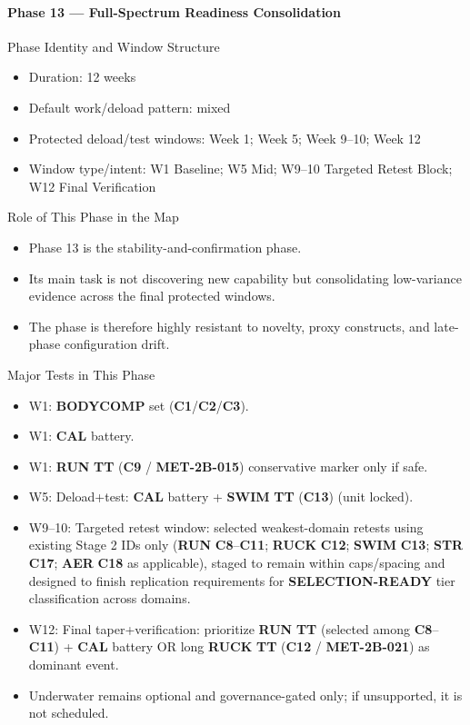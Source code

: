 \documentclass[10pt]{article}
\begin{document}
\newpage
\paragraph*{Phase 13 — Full-Spectrum Readiness Consolidation}

Phase Identity and Window Structure

\begin{itemize}
\item Duration: 12 weeks
\item Default work/deload pattern: mixed
\item Protected deload/test windows: Week 1; Week 5; Week 9–10; Week 12
\item Window type/intent: W1 Baseline; W5 Mid; W9–10 Targeted Retest Block; W12 Final Verification
\end{itemize}

Role of This Phase in the Map

\begin{itemize}
\item Phase 13 is the stability-and-confirmation phase.
\item Its main task is not discovering new capability but consolidating low-variance evidence across the final protected windows.
\item The phase is therefore highly resistant to novelty, proxy constructs, and late-phase configuration drift.
\end{itemize}

Major Tests in This Phase

\begin{itemize}
\item W1: \textbf{BODYCOMP} set (\textbf{C1}/\textbf{C2}/\textbf{C3}).
\item W1: \textbf{CAL} battery.
\item W1: \textbf{RUN} \textbf{TT} (\textbf{C9} / \textbf{MET-2B-015}) conservative marker only if safe.
\item W5: Deload+test: \textbf{CAL} battery + \textbf{SWIM} \textbf{TT} (\textbf{C13}) (unit locked).
\item W9–10: Targeted retest window: selected weakest-domain retests using existing Stage 2 IDs only (\textbf{RUN} \textbf{C8}–\textbf{C11}; \textbf{RUCK} \textbf{C12}; \textbf{SWIM} \textbf{C13}; \textbf{STR} \textbf{C17}; \textbf{AER} \textbf{C18} as applicable), staged to remain within caps/spacing and designed to finish replication requirements for \textbf{SELECTION-READY} tier classification across domains.
\item W12: Final taper+verification: prioritize \textbf{RUN} \textbf{TT} (selected among \textbf{C8}–\textbf{C11}) + \textbf{CAL} battery OR long \textbf{RUCK} \textbf{TT} (\textbf{C12} / \textbf{MET-2B-021}) as dominant event.
\item Underwater remains optional and governance-gated only; if unsupported, it is not scheduled.
\end{itemize}
\end{document}
